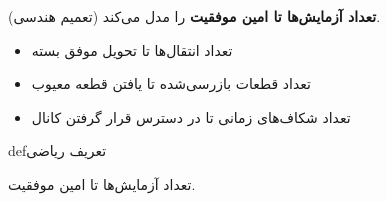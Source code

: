 \begin{Shaded}
\begin{Highlighting}[]
\NormalTok{(}\OperatorTok{,}\OperatorTok{,}\NormalTok{)}\OperatorTok{;}
\NormalTok{(}\OperatorTok{,} \OperatorTok{,} \OperatorTok{,} \OperatorTok{,} \NormalTok{)}\OperatorTok{;}
\NormalTok{(}\NormalTok{)}\OperatorTok{;} \NormalTok{(}\NormalTok{)}\OperatorTok{;}
\NormalTok{(}\NormalTok{)}\OperatorTok{;}
 \OperatorTok{;}

\NormalTok{(}\OperatorTok{,} \OperatorTok{/}\OperatorTok{,} \NormalTok{(}\NormalTok{))}\OperatorTok{;}
\end{Highlighting}
\end{Shaded}



\textbf{تعداد آزمایش‌ها تا امین موفقیت} را مدل می‌کند (تعمیم هندسی).


\begin{itemize}
\tightlist
\item
  تعداد انتقال‌ها تا تحویل موفق  بسته
\item
  تعداد قطعات بازرسی‌شده تا یافتن  قطعه معیوب
\item
  تعداد شکاف‌های زمانی تا در دسترس قرار گرفتن  کانال
\end{itemize}

\begin{PSbox}[unbreakable]{def}{تعریف ریاضی}

 تعداد آزمایش‌ها تا امین موفقیت.

\end{PSbox}

